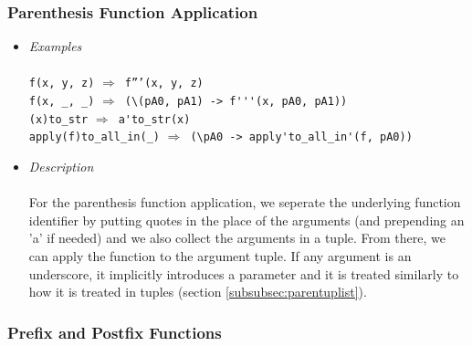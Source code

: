\documentclass{article}
\def\lra{$\Longrightarrow$\ }
\begin{document}
\newpage
\subsubsection{Parenthesis Function Application}

\begin{itemize}
\item
\textit{Examples}\\\\
\texttt{f(x, y, z)} \lra \texttt{f'''(x, y, z)} \\
\verb|f(x, _, _)| \lra \verb|(\(pA0, pA1) -> f'''(x, pA0, pA1))| \\
\verb|(x)to_str| \lra \verb|a'to_str(x)| \\
\verb|apply(f)to_all_in(_)| \lra \verb|(\pA0 -> apply'to_all_in'(f, pA0))| \\

\item
\textit{Description}\\\\
For the parenthesis function application, we seperate the underlying function
identifier by putting quotes in the place of the arguments (and prepending an
'a' if needed) and we also collect the arguments in a tuple. From there, we can
apply the function to the argument tuple. If any argument is an underscore, it
implicitly introduces a parameter and it is treated similarly to how it is
treated in tuples (section \ref{subsubsec:parentuplist}).

\end{itemize}

\subsubsection{Prefix and Postfix Functions}
\label{subsubsec:prepostfuncs}
\end{document}
